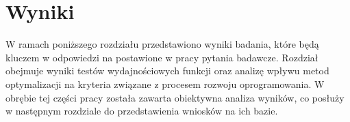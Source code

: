 \chapter{Wyniki}\label{chapter:wyniki}

W ramach poniższego rozdziału przedstawiono wyniki badania, które będą kluczem w odpowiedzi na postawione w pracy pytania badawcze.
Rozdział obejmuje wyniki testów wydajnościowych funkcji oraz analizę wpływu metod optymalizacji na kryteria związane z procesem rozwoju oprogramowania.
W obrębie tej części pracy została zawarta obiektywna analiza wyników, co posłuży w następnym rozdziale do przedstawienia wniosków na ich bazie.












